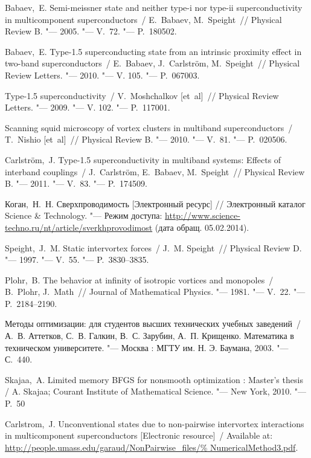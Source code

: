 \begin{thebibliography}{10}
     Babaev,~E. Semi-meissner state and neither type-i nor 
        type-ii superconductivity in multicomponent superconductors~/ 
        E.~Babaev, M.~Speight~// Physical Review B. "--- 2005. "---
        V.~72. "--- P.~180502.

     Babaev,~E. Type-1.5 superconducting state from an 
        intrinsic proximity effect in two-band superconductors~/ 
        E.~Babaev, J.~Carlstr\"om, M.~Speight~// Physical Review Letters. "---
        2010. "--- V. 105. "--- P.~067003.

     Type-1.5 superconductivity~/ V.~Moshchalkov [et~al]~// 
        Physical Review Letters. "--- 2009. "--- V. 102. "--- P.~117001.

     Scanning squid microscopy of vortex clusters in multiband 
        superconductors~/ T.~Nishio [et~al]~// Physical Review B. "---
        2010. "--- V.~81. "--- P.~020506.

     Carlstr\"om,~J. Type-1.5 superconductivity in multiband 
        systems: Effects of interband couplings~/ J.~Carlstr\"om, E.~Babaev, 
        M.~Speight~// Physical Review B. "--- 2011. "--- V.~83. "--- 
        P.~174509.

     Коган,~Н.~Н. Сверхпроводимость 
        [Электронный ресурс] // Электронный каталог Science \& Technology. "---
        Режим доступа: 
        \url{http://www.science-techno.ru/nt/article/sverkhprovodimost} 
        (дата обращ. 05.02.2014).

     Speight,~J.~M. Static intervortex forces~/ 
        J.~M. Speight~// Physical Review D. "--- 1997. "--- V.~55. "--- 
        P.~3830--3835.

     Plohr,~B. The behavior at infinity of isotropic vortices 
        and monopoles~/ B.~Plohr, J.~Math~// 
        Journal of Mathematical Physics. "--- 1981. "--- V.~22. "--- 
        P.~2184--2190.

     Методы оптимизации: для студентов высших технических 
        учебных заведений~/ А.~В. Аттетков, С.~В. Галкин, В.~С. Зарубин, 
        А.~П. Крищенко. Математика в техническом университете. "--- 
        Москва : МГТУ им. Н. Э. Баумана, 2003. "--- С.~440.

     Skajaa,~A. Limited memory BFGS for nonsmooth 
        optimization : Master's thesis / A. Skajaa; Courant Institute of 
        Mathematical Science. "--- New York, 2010. "--- P.~50

     Carlstrom,~J. Unconventional states due to 
        non-pairwise intervortex interactions in multicomponent 
        superconductors [Electronic resource]~/ Available at: 
        \url{http://people.umass.edu/garaud/NonPairwise_files/%
            NumericalMethod3.pdf}.
\end{thebibliography}

\newpage